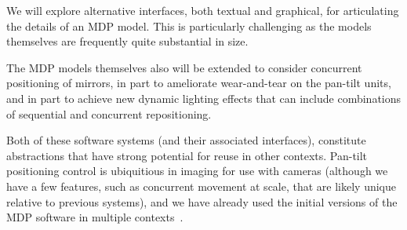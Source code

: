 We will explore alternative interfaces, both textual and graphical,
for articulating the details of an MDP model.  This is particularly
challenging as the models themselves are frequently quite substantial
in size.

The MDP models themselves also will be extended to consider concurrent
positioning of mirrors, in part to ameliorate wear-and-tear on the
pan-tilt units, and in part to achieve new dynamic lighting effects
that can include combinations of sequential and concurrent
repositioning.

Both of these software systems (and their associated interfaces), constitute
abstractions that have strong potential for reuse in other contexts.
Pan-tilt positioning control is ubiquitious in imaging for use
with cameras (although we have a few features, such as concurrent movement
at scale, that are likely unique relative to previous systems),
and we have already used the initial versions of the MDP
software in multiple contexts~\cite{mskgct13,tggs10}.
